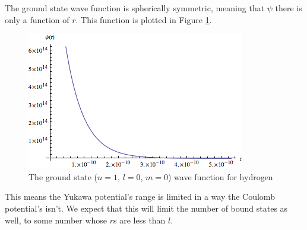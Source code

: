 \documentclass[12pt,twoside]{reedthesis}
\begin{document}
The ground state wave function is spherically symmetric, meaning that $\psi$ there is only a function of $r$. This function is plotted in Figure \ref{fig:hground}.

\begin{figure}
\includegraphics[scale=0.75]{hydground.png}
\caption{The ground state ($n=1$, $l =0$, $m= 0$) wave function for hydrogen}
\label{fig:hground}
\end{figure}



This means the Yukawa potential's range is limited in a way the Coulomb potential's isn't. We expect that this will limit the number of bound states as well, to some number whose $r$s are less than $l$.
%
%
%	
%
%
%
%
\backmatter %
%

 
  
%
   \nocite{*}
   

\end{document}
